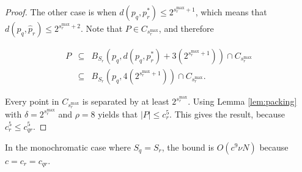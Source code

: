 \begin{proof}


The other case is when $d(p_q, p_r^*) \le 2^{s_r^{\max} + 1}$, which means that
$d(p_q, \hat{p}_r) \le 2^{s_r^{\max} + 2}$. %
Note that $P \in C_{s_r^{\max}}$, and therefore

\vspace*{-1em}
\begin{eqnarray}
P &\subseteq& B_{S_r}(p_q, d(p_q, p_r^*) + 3(2^{s_r^{\max} + 1})) \cap
C_{s_r^{\max}} \\
 &\subseteq& B_{S_r}(p_q, 4(2^{s_r^{\max} + 1})) \cap C_{s_r^{\max}}.
\end{eqnarray}
\vspace*{-0.6em}

Every point in $C_{s_r^{\max}}$ is separated by at least $2^{s_r^{\max}}$.
Using Lemma \ref{lem:packing} with $\delta = 2^{s_r^{\max}}$ and $\rho = 8$
yields that $|P| \le c_r^5$.  This gives the result, because $c_r^5 \le
c_{qr}^5$.
\end{proof}




%


In the monochromatic case where $S_q = S_r$, the bound is $O(c^9 \nu N)$ because
$c = c_r = c_{qr}$.
